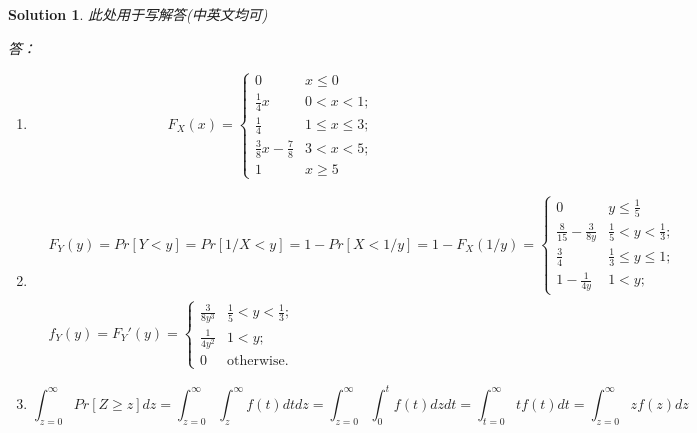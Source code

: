 \documentclass[a4paper,UTF8]{article}
\numberwithin{equation}{section}
\newtheorem*{mySol}{Solution}
\begin{document}
\begin{mySol}
此处用于写解答(中英文均可)

答：
\begin{enumerate}[ {(}1{)}]
\item 
\begin{equation}
	F_X(x) = 
	\begin{cases}
		0				& x \leq 0 \\
		\frac{1}{4} x 	& 0<x<1;\\
		\frac{1}{4} 	& 1 \leq x \leq 3;\\
		\frac{3}{8} x - \frac{7}{8} & 3<x<5;\\
		1				& x \geq 5 
	\end{cases}
\end{equation}

\item 
\begin{equation}
\begin{aligned}
	&F_Y(y)=Pr[Y<y]=Pr[1/X<y]=1-Pr[X<1/y]=1-F_X(1/y)=
	\begin{cases}
		0				& y \leq \frac{1}{5} \\
		\frac{8}{15}-\frac{3}{8y} &\frac{1}{5}<y<\frac{1}{3};\\
		\frac{3}{4} 	& \frac{1}{3} \leq y \leq 1;\\
		1 - \frac{1}{4y} & 1<y;
	\end{cases}
	\\
	&f_Y(y) = F_Y'(y) = 
	\begin{cases}
		\frac{3}{8y^3} & \frac{1}{5}<y<\frac{1}{3};\\
		\frac{1}{4y^2} & 1<y;\\
		0					& \mbox{otherwise.}
	\end{cases}
\end{aligned}
\end{equation}

\item
\[
\int^{\infty}_{z=0}{Pr[Z \geq z]dz} 
= \int^{\infty}_{z=0}\int^{\infty}_{z}{f(t)dtdz}
= \int^{\infty}_{z=0}\int^t_0{f(t)}dzdt
= \int^{\infty}_{t=0}{tf(t)}dt
= \int^{\infty}_{z=0}{zf(z)}dz
\]

\end{enumerate}

\end{mySol}

\newpage
\end{document}
